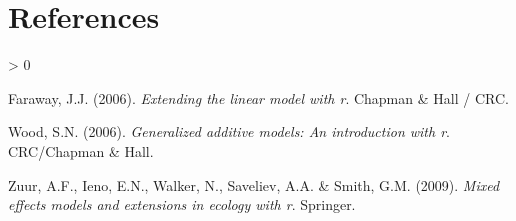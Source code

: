 \documentclass[
]{article}
\newlength{\cslhangindent}
\newenvironment{CSLReferences}[2] %
 {%
  \setlength{\parindent}{0pt}
  \ifodd #1 \everypar{\setlength{\hangindent}{\cslhangindent}}\ignorespaces\fi
  \ifnum #2 > 0
  \setlength{\parskip}{#2\baselineskip}
  \fi
 }%
 {}
\begin{document}
\hypertarget{references}{%
\section*{References}\label{references}}

\hypertarget{refs}{}
\begin{CSLReferences}{1}{0}
\leavevmode\hypertarget{ref-Faraway2006}{}%
Faraway, J.J. (2006). \emph{Extending the linear model with r}. Chapman
\& Hall / CRC.

\leavevmode\hypertarget{ref-Wood2006}{}%
Wood, S.N. (2006). \emph{Generalized additive models: An introduction
with r}. CRC/Chapman \& Hall.

\leavevmode\hypertarget{ref-Zuur2009b}{}%
Zuur, A.F., Ieno, E.N., Walker, N., Saveliev, A.A. \& Smith, G.M.
(2009). \emph{Mixed effects models and extensions in ecology with r}.
Springer.

\end{CSLReferences}
\end{document}
